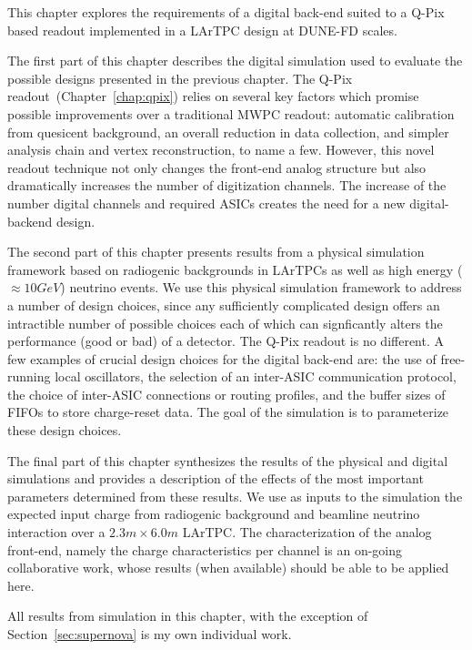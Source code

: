This chapter explores the requirements of a digital back-end suited to a Q-Pix based readout implemented in a LArTPC design at DUNE-FD scales.

The first part of this chapter describes the digital simulation used to evaluate the possible designs presented in the previous chapter.
The Q-Pix readout~(Chapter~\ref{chap:qpix}) relies on several key factors which promise possible improvements over a traditional MWPC readout: automatic calibration from quesicent background, an overall reduction in data collection, and simpler analysis chain and vertex reconstruction, to name a few.
However, this novel readout technique not only changes the front-end analog structure but also dramatically increases the number of digitization channels.
The increase of the number digital channels and required ASICs creates the need for a new digital-backend design.

The second part of this chapter presents results from a physical simulation framework based on radiogenic backgrounds in LArTPCs as well as high energy ($\approx 10\unit{GeV}$) neutrino events.
We use this physical simulation framework to address a number of design choices, since any sufficiently complicated design offers an intractible number of possible choices each of which can signficantly alters the performance (good or bad) of a detector.
The Q-Pix readout is no different.
A few examples of crucial design choices for the digital back-end are: the use of free-running local oscillators, the selection of an inter-ASIC communication protocol, the choice of inter-ASIC connections or routing profiles, and the buffer sizes of FIFOs to store charge-reset data.
The goal of the simulation is to parameterize these design choices.

The final part of this chapter synthesizes the results of the physical and digital simulations and provides a description of the effects of the most important parameters determined from these results.
We use as inputs to the simulation the expected input charge from radiogenic background and beamline neutrino interaction over a $2.3 \unit{m} \times 6.0 \unit{m}$ LArTPC.
The characterization of the analog front-end, namely the charge characteristics per channel is an on-going collaborative work, whose results (when available) should be able to be applied here.

All results from simulation in this chapter, with the exception of Section~\ref{sec:supernova} is my own individual work.







